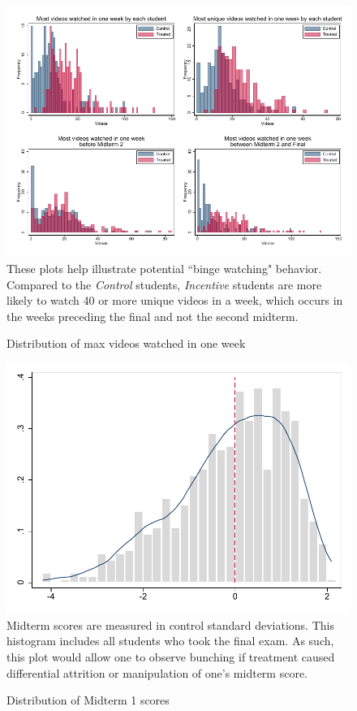 \documentclass[12pt]{article}
\begin{document}
\clearpage
\begin{figure}[t]
\begin{center}
\caption{Distribution of max videos watched in one week}
\includegraphics[width=1\textwidth, angle=0]{../plots/hist_maxweek.pdf}
\footnotesize These plots help illustrate potential ``binge watching" behavior. Compared to the \textit{Control} students, \textit{Incentive} students are more likely to watch 40 or more unique videos in a week, which occurs in the weeks preceding the final and not the second midterm.
\end{center}
\end{figure}

\clearpage
\begin{figure}[t]
\begin{center}
\caption{Distribution of Midterm 1 scores}
\label{mid1dist}
\includegraphics[width=1\textwidth, angle=0]{../plots/mid1dist.pdf}
\footnotesize Midterm scores are measured in control standard deviations. This histogram includes all students who took the final exam. As such, this plot would allow one to observe bunching if treatment caused differential attrition or manipulation of one's midterm score.
\end{center}
\end{figure}
\end{document}
